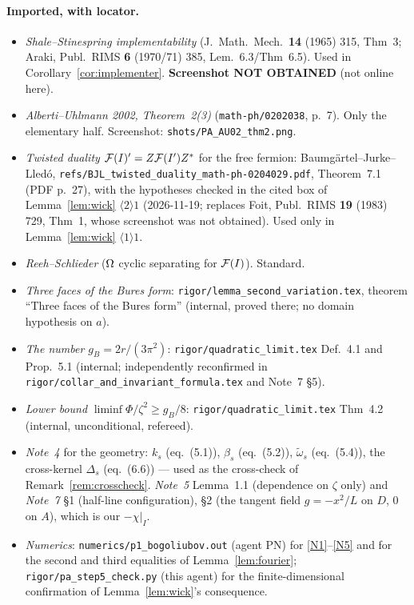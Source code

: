 \documentclass[11pt]{article}
\begin{document}
\paragraph{Imported, with locator.}
\begin{itemize}[leftmargin=1.4em]
\item \emph{Shale--Stinespring implementability} (J.\ Math.\ Mech.\ \textbf{14} (1965) 315, Thm~3;
 Araki, Publ.\ RIMS \textbf{6} (1970/71) 385, Lem.~6.3/Thm~6.5).  Used in
 Corollary~\ref{cor:implementer}.  \textbf{Screenshot NOT OBTAINED} (not online here).
\item \emph{Alberti--Uhlmann 2002, Theorem~2(3)} (\texttt{math-ph/0202038}, p.~7).  Only the
 elementary half.  Screenshot: \texttt{shots/PA\_AU02\_thm2.png}.
\item \emph{Twisted duality} $\mathcal F(I)'=Z\mathcal F(I')Z^*$ for the free fermion: Baumg\"artel--Jurke--Lled\'o,
 \texttt{refs/BJL\_twisted\_duality\_math-ph-0204029.pdf}, Theorem~7.1 (PDF p.~27), with the hypotheses checked in the
 cited box of Lemma~\ref{lem:wick} $\langle2\rangle1$ (2026-11-19; replaces Foit, Publ.\ RIMS \textbf{19} (1983) 729,
 Thm~1, whose screenshot was not obtained).  Used only in Lemma~\ref{lem:wick} $\langle1\rangle1$.
\item \emph{Reeh--Schlieder} ($\Omega$ cyclic separating for $\mathcal F(I)$).  Standard.
\item \emph{Three faces of the Bures form}: \texttt{rigor/lemma\_second\_variation.tex}, theorem
 ``Three faces of the Bures form'' (internal, proved there; no domain hypothesis on $a$).
\item \emph{The number $g_B=2r/(3\pi^2)$}: \texttt{rigor/quadratic\_limit.tex} Def.~4.1 and
 Prop.~5.1 (internal; independently reconfirmed in
 \texttt{rigor/collar\_and\_invariant\_formula.tex} and Note~7 \S5).
\item \emph{Lower bound} $\liminf\Phi/\zeta^2\ge g_B/8$: \texttt{rigor/quadratic\_limit.tex}
 Thm~4.2 (internal, unconditional, refereed).
\item \emph{Note~4} for the geometry: $k_s$ (eq.~(5.1)), $\beta_s$ (eq.~(5.2)),
 $\widetilde\omega_s$ (eq.~(5.4)), the cross-kernel $\Delta_s$ (eq.~(6.6)) --- used as the
 cross-check of Remark~\ref{rem:crosscheck}.  \emph{Note~5} Lemma~1.1 (dependence on $\zeta$ only)
 and \emph{Note~7} \S1 (half-line configuration), \S2 (the tangent field $g=-x^2/L$ on $D$, $0$ on
 $A$), which is our $-\chi|_I$.
\item \emph{Numerics}: \texttt{numerics/p1\_bogoliubov.out} (agent PN) for \ref{N1}--\ref{N5} and for
 the second and third equalities of Lemma~\ref{lem:fourier}; \texttt{rigor/pa\_step5\_check.py}
 (this agent) for the finite-dimensional confirmation of Lemma~\ref{lem:wick}'s consequence.
\end{itemize}
\end{document}
